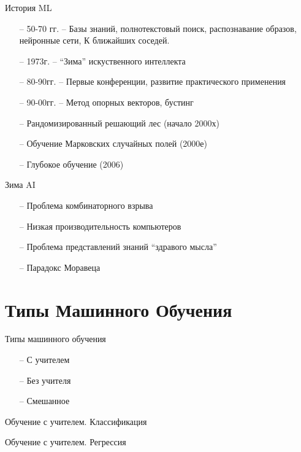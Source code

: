 \documentclass[10pt]{beamer}
\begin{document}
\begin{frame}{История ML}
	\begin{itemize}
	  \item[--] 50-70 гг. -- Базы знаний, полнотекстовый поиск, распознавание образов, нейронные сети, К ближайших соседей.
	  \item[--] 1973г. -- “Зима” искуственного интеллекта
	  \item[--] 80-90гг.  -- Первые конференции, развитие практического применения
	  \item[--] 90-00гг. -- Метод опорных векторов, бустинг
	  \item[--] Рандомизированный решающий лес (начало 2000х)
	  \item[--] Обучение Марковских случайных полей (2000е)
	  \item[--] Глубокое обучение (2006)
	\end{itemize}
\end{frame}

\begin{frame}{Зима AI}
	\begin{itemize}
	  \item[--] Проблема комбинаторного взрыва
	  \item[--] Низкая производительность компьютеров
	  \item[--] Проблема представлений знаний “здравого мысла”
	  \item[--] Парадокс Моравеца
	\end{itemize}
\end{frame}

\section{Типы Машинного Обучения}

\begin{frame}{Типы машинного обучения}
	\begin{itemize}
	  \item[--] С учителем
	  \item[--] Без учителя
	  \item[--] Смешанное
	\end{itemize}
\end{frame}

\begin{frame}{Обучение с учителем. Классификация}
\end{frame}

\begin{frame}{Обучение с учителем. Регрессия}
\end{frame}
\end{document}

